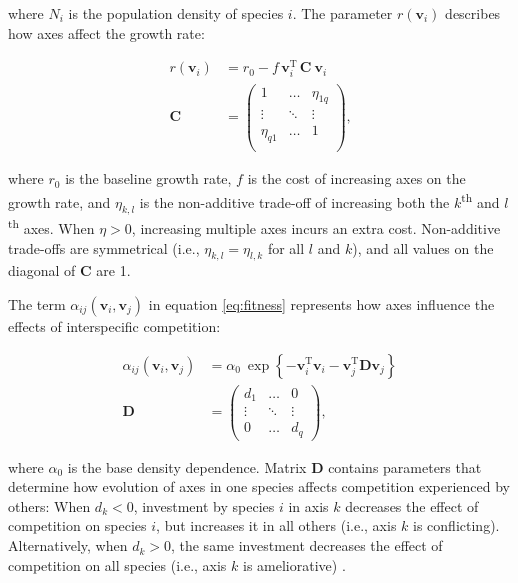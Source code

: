 \noindent where $N_i$ is the population density of species $i$.
The parameter $r(\mathbf{v}_i)$ describes how axes affect
the growth rate:

\begin{equation} \label{eq:growth-rate}
\begin{split}
    r(\mathbf{v}_i) &= r_0 - f \, \mathbf{v}_i^{\textrm{T}} \, \mathbf{C} ~ \mathbf{v}_{i} \\
    \mathbf{C} &= \begin{pmatrix}
        1         & \ldots & \eta_{1q} \\
        \vdots    & \ddots & \vdots \\
        \eta_{q1} & \ldots & 1      \\
        \end{pmatrix}
    \textrm{,}
\end{split}
\end{equation}

\noindent where $r_0$ is the baseline growth rate,
$f$ is the cost of increasing axes on the growth rate, and
$\eta_{k,l}$ is the non-additive trade-off of increasing both the
$k$\textsuperscript{th} and $l$\textsuperscript{th} axes.
When $\eta > 0$, increasing multiple axes incurs an extra cost.
Non-additive trade-offs are symmetrical (i.e., $\eta_{k,l} = \eta_{l,k}$ for all
$l$ and $k$), and all values on the diagonal of $\mathbf{C}$ are 1.


The term $\alpha_{ij}(\mathbf{v}_i, \mathbf{v}_j)$
in equation \ref{eq:fitness} represents how axes influence the effects
of interspecific competition:

\begin{equation} \label{eq:competition}
\begin{split}
    \alpha_{ij}(\mathbf{v}_i, \mathbf{v}_j) &= \alpha_0 ~\exp \left\{
        - \mathbf{v}_i^{\textrm{T}} \mathbf{v}_i -
        \mathbf{v}_j^{\textrm{T}} \mathbf{D} \mathbf{v}_j \right\} \\
    \mathbf{D} &= \begin{pmatrix}
        d_1     & \ldots    & 0 \\
        \vdots  & \ddots    & \vdots \\
        0       & \ldots    & d_q
        \end{pmatrix}
	\textrm{,}
\end{split}
\end{equation}



\noindent where $\alpha_0$ is the base density dependence.
Matrix $\mathbf{D}$ contains parameters that determine how evolution of axes
in one species affects competition experienced by others:
When $d_k < 0$, investment by species $i$ in axis $k$ decreases the
effect of competition on species $i$, but increases it in all others
(i.e., axis $k$ is conflicting).
Alternatively, when $d_k > 0$, the same investment decreases the effect of
competition on all species (i.e., axis $k$ is ameliorative)
\citep{Northfield2013a}.


